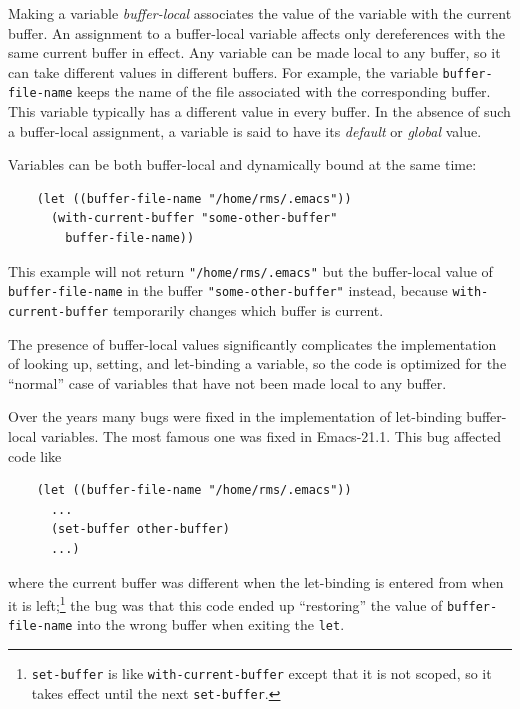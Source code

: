 \documentclass[format=acmsmall, review]{acmart}
\begin{document}
Making a variable \emph{buffer-local} associates the value of the variable
with the current buffer.  An assignment to a buffer-local variable
affects only dereferences with the same current buffer in effect.
Any variable can be made local to any buffer, so it can take
different values in different buffers.  For example, the variable
\texttt{buffer-file-name} keeps the name of the file associated with the
corresponding buffer.  This variable typically has a different value in
every buffer.  In the absence of such a buffer-local assignment, a variable
is said to have its \emph{default} or \emph{global} value.

Variables can be both buffer-local and dynamically bound at the same time:
\begin{verbatim}
    (let ((buffer-file-name "/home/rms/.emacs"))
      (with-current-buffer "some-other-buffer"
        buffer-file-name))
\end{verbatim}
This example will not return \texttt{"/home/rms/.emacs"} but the
buffer-local value of \texttt{buffer-file-name} in the buffer
\texttt{"some-other-buffer"} instead, because \texttt{with-current-buffer}
temporarily changes which buffer is current.

The presence of buffer-local values significantly complicates the
implementation of looking up, setting, and let-binding a variable, so the
code is optimized for the ``normal'' case of variables that have not been
made local to any buffer.

Over the years many bugs were fixed in the implementation of let-binding
buffer-local variables.  The most famous one was fixed in Emacs-21.1.
This bug affected code like
\begin{verbatim}
    (let ((buffer-file-name "/home/rms/.emacs"))
      ...
      (set-buffer other-buffer)
      ...)
\end{verbatim}
where the current buffer was different when the let-binding is entered from
when it is left;\footnote{\texttt{set-buffer} is like
  \texttt{with-current-buffer} except that it is not scoped, so it takes
  effect until the next \texttt{set-buffer}.} the bug was that this code
ended up ``restoring'' the value of \texttt{buffer-file-name} into the
wrong buffer when exiting the \texttt{let}.
\end{document}
